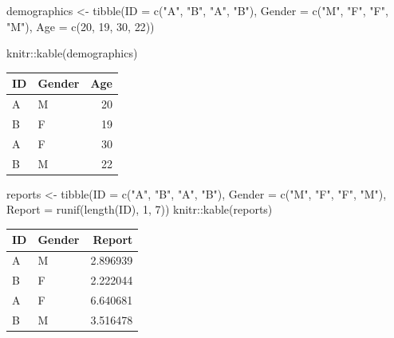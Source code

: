 \documentclass[
]{book}
\newenvironment{Shaded}{\begin{snugshade}}{\end{snugshade}}
\newcommand{\AttributeTok}[1]{\textcolor[rgb]{0.77,0.63,0.00}{#1}}
\newcommand{\DecValTok}[1]{\textcolor[rgb]{0.00,0.00,0.81}{#1}}
\newcommand{\FunctionTok}[1]{\textcolor[rgb]{0.00,0.00,0.00}{#1}}
\newcommand{\NormalTok}[1]{#1}
\newcommand{\OtherTok}[1]{\textcolor[rgb]{0.56,0.35,0.01}{#1}}
\newcommand{\SpecialCharTok}[1]{\textcolor[rgb]{0.00,0.00,0.00}{#1}}
\newcommand{\StringTok}[1]{\textcolor[rgb]{0.31,0.60,0.02}{#1}}
\begin{document}
\begin{Shaded}
\begin{Highlighting}[]
\NormalTok{demographics }\OtherTok{\textless{}{-}} \FunctionTok{tibble}\NormalTok{(}\AttributeTok{ID =} \FunctionTok{c}\NormalTok{(}\StringTok{"A"}\NormalTok{, }\StringTok{"B"}\NormalTok{, }\StringTok{"A"}\NormalTok{, }\StringTok{"B"}\NormalTok{),}
                       \AttributeTok{Gender =} \FunctionTok{c}\NormalTok{(}\StringTok{"M"}\NormalTok{, }\StringTok{"F"}\NormalTok{, }\StringTok{"F"}\NormalTok{, }\StringTok{"M"}\NormalTok{),}
                       \AttributeTok{Age =} \FunctionTok{c}\NormalTok{(}\DecValTok{20}\NormalTok{, }\DecValTok{19}\NormalTok{, }\DecValTok{30}\NormalTok{, }\DecValTok{22}\NormalTok{))}

\NormalTok{knitr}\SpecialCharTok{::}\FunctionTok{kable}\NormalTok{(demographics)}
\end{Highlighting}
\end{Shaded}

\begin{tabular}{l|l|r}
\hline
ID & Gender & Age\\
\hline
A & M & 20\\
\hline
B & F & 19\\
\hline
A & F & 30\\
\hline
B & M & 22\\
\hline
\end{tabular}

\begin{Shaded}
\begin{Highlighting}[]
\NormalTok{reports }\OtherTok{\textless{}{-}} \FunctionTok{tibble}\NormalTok{(}\AttributeTok{ID =} \FunctionTok{c}\NormalTok{(}\StringTok{"A"}\NormalTok{, }\StringTok{"B"}\NormalTok{, }\StringTok{"A"}\NormalTok{, }\StringTok{"B"}\NormalTok{),}
                  \AttributeTok{Gender =} \FunctionTok{c}\NormalTok{(}\StringTok{"M"}\NormalTok{, }\StringTok{"F"}\NormalTok{, }\StringTok{"F"}\NormalTok{, }\StringTok{"M"}\NormalTok{),}
                  \AttributeTok{Report =} \FunctionTok{runif}\NormalTok{(}\FunctionTok{length}\NormalTok{(ID), }\DecValTok{1}\NormalTok{, }\DecValTok{7}\NormalTok{))}
\NormalTok{knitr}\SpecialCharTok{::}\FunctionTok{kable}\NormalTok{(reports)}
\end{Highlighting}
\end{Shaded}

\begin{tabular}{l|l|r}
\hline
ID & Gender & Report\\
\hline
A & M & 2.896939\\
\hline
B & F & 2.222044\\
\hline
A & F & 6.640681\\
\hline
B & M & 3.516478\\
\hline
\end{tabular}
\end{document}
